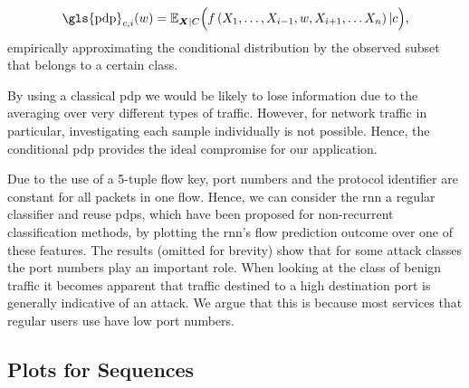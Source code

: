 \documentclass[conference]{IEEEtran}
\begin{document}
\begin{equation} \label{eq:pdp_conditional}
\text{\gls{pdp}}_{c,i}(w) = \mathbb E_{\boldsymbol X | C} \Big(f \left( X_1,\ldots,X_{i-1},w,X_{i+1},\ldots X_n \right) | c\Big),
\end{equation}
empirically approximating the conditional distribution by the observed subset that belongs to a certain class.

By using a classical \gls{pdp} we would be likely to lose information due to the averaging over very different types of traffic. However, for network traffic in particular, investigating each sample individually is not possible. Hence, the conditional \gls{pdp} provides the ideal compromise for our application.

Due to the use of a 5-tuple flow key, port numbers and the protocol identifier are constant for all packets in one flow.
Hence, we can consider the \gls{rnn} a regular classifier and reuse 
\glspl{pdp}, which have been proposed for non-recurrent classification methods, by plotting the \gls{rnn}'s flow prediction outcome over one of these  features.
The results (omitted for brevity) show that for some attack classes the port numbers play an important role. When looking at the class of benign traffic %
it becomes apparent that traffic destined to a high destination port is generally indicative of an attack. We argue that this is because most services that regular users use have low port numbers.

\subsection{Plots for Sequences}
\end{document}
